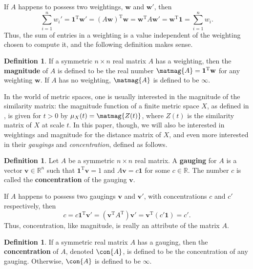 \documentclass[a4paper, oneside, reqno]{amsart}
\theoremstyle{definition}
\newtheorem{definition}[theorem]{Definition}
\theoremstyle{remark}
\numberwithin{equation}{section}
\newcommand{\demph}[1]{\emph{#1}}
\renewcommand{\vec}{\mathbf}
\newcommand{\onevector}{\mathbf{1}}
\newcommand{\transpose}{\mathrm{T}}
\newcommand{\R}{\mathbb{R}}
\newcommand{\define}{\textbf}
\begin{document}
If \(A\) happens to possess two weightings, \(\vec{w}\) and \(\vec{w}'\), then
\[\sum_{i=1}^n w_i' = \onevector^\transpose \vec{w}' = (A \vec{w})^\transpose \vec{w} = \vec{w}^\transpose A \vec{w}' = \vec{w}^\transpose \onevector = \sum_{i=1}^n w_i.\]
Thus, the sum of entries in a weighting is a value independent of the weighting chosen to compute it, and the following definition makes sense.

\begin{definition}
\label{def:matrix_magnitude}
    If a symmetric \(n \times n\) real matrix \(A\) has a weighting, then the \define{magnitude} of \(A\) is defined to be the real number \(\matmag{A} = \onevector^\transpose \vec{w}\) for any weighting \(\vec{w}\). If \(A\) has no weighting, \(\matmag{A}\) is defined to be \(\infty\).
\end{definition}

In the world of metric spaces, one is usually interested in the magnitude of the similarity matrix: the magnitude function of a finite metric space \(X\), as defined in , is given for \(t > 0\) by \(\mu_X(t) = \matmag{Z(t)}\), where \(Z(t)\) is the similarity matrix of \(X\) at scale \(t\). In this paper, though, we will also be interested in weightings and magnitude for the distance matrix of \(X\), and even more interested in their \demph{gaugings} and \demph{concentration}, defined as follows.

\begin{definition}
\label{def:gauging}
    Let \(A\) be a symmetric \(n \times n\) real matrix. A \define{gauging} for \(A\) is a vector \(\vec{v} \in \R^n\) such that \(\onevector^\transpose \vec{v} = 1\) and \(A \vec{v} = c \onevector\) for some \(c \in \R\).  The number \(c\) is called the \define{concentration} of the gauging \(\vec{v}\). 
\end{definition}

If \(A\) happens to possess two gaugings \(\vec{v}\) and \(\vec{v}'\), with concentrations \(c\) and \(c'\) respectively, then
\[c = c \onevector^\transpose \vec{v}' = (\vec{v}^\transpose A^\transpose) \vec{v}' = \vec{v}^\transpose (c' \onevector) = c'.\]
Thus, concentration, like magnitude, is really an attribute of the matrix \(A\).

\begin{definition}
\label{def:concentration}
    If a symmetric real matrix \(A\) has a gauging, then the \define{concentration} of \(A\), denoted \(\con{A}\), is defined to be the concentration of any gauging. Otherwise, \(\con{A}\) is defined to be \(\infty\).
\end{definition}
\end{document}

